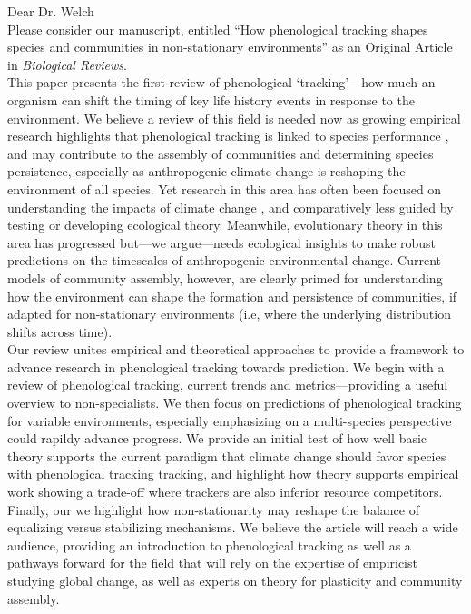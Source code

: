 \documentclass[11pt,a4paper]{article}
\begin{document}
\noindent Dear Dr. Welch
\vspace{1.5ex}\\
Please consider our manuscript, entitled ``How phenological tracking shapes species and communities in non-stationary environments'' as an Original Article in \emph{Biological Reviews}. 
\vspace{1.5ex}\\
This paper presents the first review of phenological `tracking'---how much an organism can shift the timing of key life history events in response to the environment. We believe a review of this field is needed now as growing empirical research highlights that phenological tracking is linked to species performance \citep[e.g.,][]{Cleland:2012,Zettlemoyer2019}, and may contribute to the assembly of communities and determining species persistence, especially as anthropogenic climate change is reshaping the environment of all species. Yet research in this area has often been focused on understanding the impacts of climate change \citep[e.g.,][]{thackeray2016,cohen2018,kharouba2018}, and comparatively less guided by testing or developing ecological theory. Meanwhile, evolutionary theory in this area has progressed but---we argue---needs ecological insights to make robust predictions on the timescales of anthropogenic environmental change. Current models of community assembly, however, are clearly primed for understanding how the environment can shape the formation and persistence of communities, if adapted for non-stationary environments (i.e, where the underlying distribution shifts across time).
\vspace{1.5ex}\\
Our review unites empirical and theoretical approaches to provide a framework to advance research in phenological tracking towards prediction. We begin with a review of phenological tracking, current trends and metrics---providing a useful overview to non-specialists. We then focus on predictions of phenological tracking for variable environments, especially emphasizing on a multi-species perspective could rapildy advance progress. We provide an initial test of how well basic theory supports the current paradigm that climate change should favor species with phenological tracking tracking, and highlight how theory supports empirical work showing a trade-off where trackers are also inferior resource competitors. Finally, our we highlight how non-stationarity may reshape the balance of equalizing versus stabilizing mechanisms. We believe the article will reach a wide audience, providing an introduction to phenological tracking as well as a pathways forward for the field that will rely on the expertise of empiricist studying global change, as well as experts on theory for plasticity and community assembly.
\end{document}

